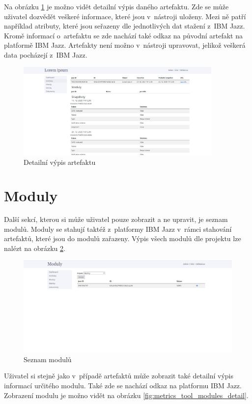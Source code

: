 \documentclass[czech,master]{diploma}
\begin{document}
Na obrázku \ref{fig:metrics_tool_artifacts_detail} je možno vidět detailní výpis daného artefaktu. Zde se může uživatel dozvědět veškeré informace, které jsou v~nástroji uloženy. Mezi ně patří například atributy, které jsou seřazeny dle jednotlivých dat stažení z~IBM Jazz. Kromě informací o~artefaktu se zde nachází také odkaz na původní artefakt na platformě IBM Jazz. Artefakty není možno v~nástroji upravovat, jelikož veškerá data pocházejí z~IBM Jazz.

\begin{figure}[!ht]
    \centering
    \includegraphics[width=0.9\textwidth]{Diplomka/Figures/metrics_tool/artifacts_detail.jpg}
    \caption{Detailní výpis artefaktu}
    \label{fig:metrics_tool_artifacts_detail}
\end{figure}
\section{Moduly}
Další sekcí, kterou si může uživatel pouze zobrazit a ne upravit, je seznam modulů. Moduly se stahují taktéž z~platformy IBM Jazz v~rámci stahování artefaktů, které jsou do modulů zařazeny. Výpis všech modulů dle projektu lze nalézt na obrázku \ref{fig:metrics_tool_modules}.

\begin{figure}[!ht]
    \centering
    \includegraphics[width=1\textwidth]{Diplomka/Figures/metrics_tool/modules.jpg}
    \caption{Seznam modulů}
    \label{fig:metrics_tool_modules}
\end{figure}
Uživatel si stejně jako v~případě artefaktů může zobrazit také detailní výpis informací určitého modulu. Také zde se nachází odkaz na platformu IBM Jazz. Zobrazení modulu je možno vidět na obrázku \ref{fig:metrics_tool_modules_detail}.
\end{document}

